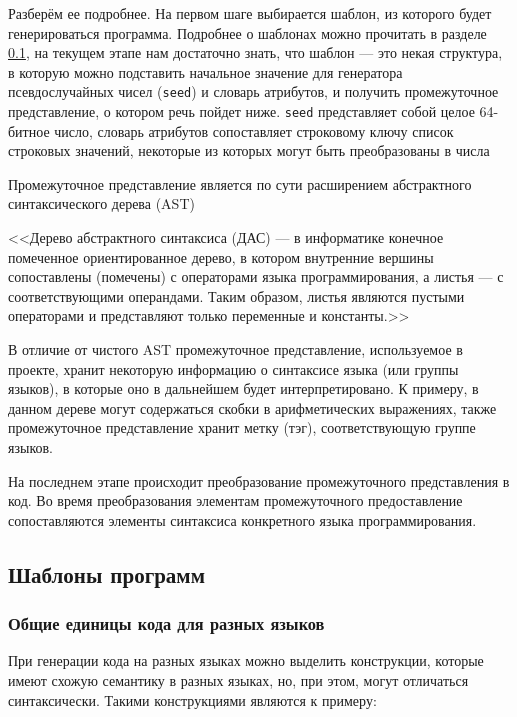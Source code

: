 Разберём ее подробнее. На первом шаге выбирается шаблон, из которого будет генерироваться
программа. Подробнее о шаблонах можно прочитать в разделе \ref{templates}, на текущем этапе нам достаточно
знать, что шаблон --- это некая структура, в которую можно подставить начальное значение для
генератора псевдослучайных чисел (\texttt{seed}) и словарь атрибутов, и получить промежуточное
представление, о котором речь пойдет ниже. \texttt{seed} представляет собой целое
64-битное число, словарь атрибутов сопоставляет строковому ключу список строковых значений,
некоторые из которых могут быть преобразованы в числа

Промежуточное представление является по сути расширением абстрактного синтаксического
дерева (AST)

<<Дерево абстрактного синтаксиса (ДАС) — в информатике конечное помеченное ориентированное дерево, в котором внутренние вершины сопоставлены (помечены) с операторами языка программирования, а листья — с соответствующими операндами. Таким образом, листья являются пустыми операторами и представляют только переменные и константы.>> \cite{ast}

В отличие от чистого AST промежуточное представление, используемое в проекте, хранит
некоторую информацию о синтаксисе языка (или группы языков), в которые оно в дальнейшем
будет интерпретировано. К примеру, в данном дереве могут содержаться скобки в арифметических выражениях,
также промежуточное представление хранит метку (тэг), соответствующую группе языков.

На последнем этапе происходит преобразование промежуточного представления в код. Во время преобразования
элементам промежуточного предоставление сопоставляются элементы синтаксиса конкретного языка программирования.

\subsection{Шаблоны программ}
\label{templates}

\subsubsection{Общие единицы кода для разных языков}
При генерации кода на разных языках можно выделить конструкции, которые имеют схожую
семантику в разных языках, но, при этом, могут отличаться синтаксически. Такими
конструкциями являются к примеру:

